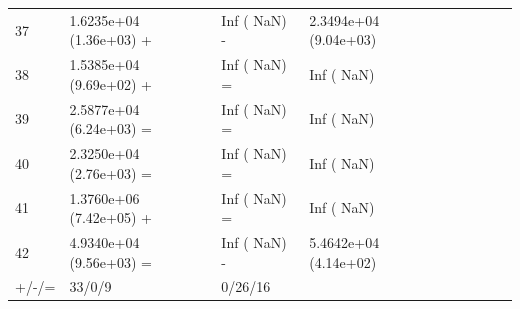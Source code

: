 \documentclass[11pt]{article}
\begin{document}
\begin{table}[htbp]
{\begin{tabular}{lllllllll}
37    & 1.6235e+04 (1.36e+03) + & Inf (     NaN) -        & 2.3494e+04 (9.04e+03) \\
38    & 1.5385e+04 (9.69e+02) + & Inf (     NaN) =        & Inf (     NaN)        \\
39    & 2.5877e+04 (6.24e+03) = & Inf (     NaN) =        & Inf (     NaN)        \\
40    & 2.3250e+04 (2.76e+03) = & Inf (     NaN) =        & Inf (     NaN)        \\
41    & 1.3760e+06 (7.42e+05) + & Inf (     NaN) =        & Inf (     NaN)        \\
42    & 4.9340e+04 (9.56e+03) = & Inf (     NaN) -        & 5.4642e+04 (4.14e+02) \\
\hline
+/-/= & 33/0/9                  & 0/26/16                 & \multicolumn{1}{l}{} 
\\
\hline
\end{tabular}
}
\end{table}
\end{document}
